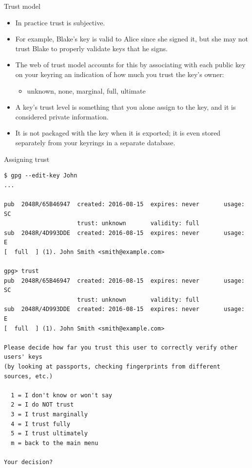 \documentclass[
mode=present,
paper=smartboard,
size=20pt,
]{powerdot}
\begin{document}
\begin{slide}{Trust model}
  \begin{itemize}
  \item In practice trust is subjective.
  \item For example, Blake's key is valid to Alice since she signed
    it, but she may not trust Blake to properly validate keys that he
    signs.
  \item The web of trust model accounts for this by associating with
    each public key on your keyring an indication of how much you
    trust the key's owner:
    \begin{itemize}
    \item unknown, none, marginal, full, ultimate
    \end{itemize}
  \item A key's trust level is something that you alone assign to the
    key, and it is considered private information.
  \item It is not packaged with the key when it is exported; it is
    even stored separately from your keyrings in a separate database.
  \end{itemize}
\end{slide}

\makeatletter\renewcommand{\verbatim@font}{\scriptsize\tt}\makeatother
\begin{slide}[method=direct]{Assigning trust}
\vspace{-10mm}
\begin{verbatim}
$ gpg --edit-key John
...

pub  2048R/65B46947  created: 2016-08-15  expires: never       usage: SC  
                     trust: unknown       validity: full
sub  2048R/4D993DDE  created: 2016-08-15  expires: never       usage: E   
[  full  ] (1). John Smith <smith@example.com>

gpg> trust
pub  2048R/65B46947  created: 2016-08-15  expires: never       usage: SC  
                     trust: unknown       validity: full
sub  2048R/4D993DDE  created: 2016-08-15  expires: never       usage: E   
[  full  ] (1). John Smith <smith@example.com>

Please decide how far you trust this user to correctly verify other users' keys
(by looking at passports, checking fingerprints from different sources, etc.)

  1 = I don't know or won't say
  2 = I do NOT trust
  3 = I trust marginally
  4 = I trust fully
  5 = I trust ultimately
  m = back to the main menu

Your decision?
\end{verbatim}
\end{slide}
\end{document}
